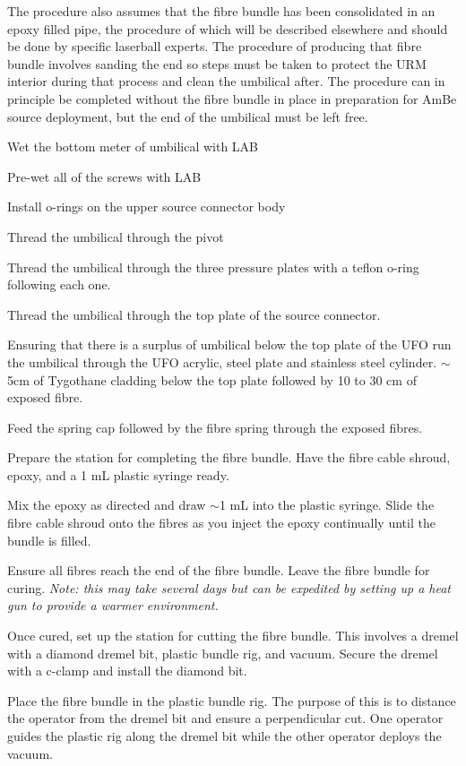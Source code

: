 \documentclass[11pt]{article}
\begin{document}
The procedure also assumes that the fibre bundle has been consolidated
in an epoxy filled pipe, the procedure of which will be described
elsewhere and should be done by specific laserball experts. The
procedure of producing that fibre bundle involves sanding the end so
steps must be taken to protect the URM interior during that process
and clean the umbilical after. The procedure can in principle be
completed without the fibre bundle in place in preparation for AmBe
source deployment, but the end of the umbilical must be left free.

\begin{answerlist}
\item Wet the bottom meter of umbilical with LAB
\item Pre-wet all of the screws with LAB
\item Install o-rings on the upper source connector body 
\item Thread the umbilical through the pivot
\item Thread the umbilical through the three pressure plates with a teflon o-ring following each one.
\item Thread the umbilical through the top plate of the source connector.
\item Ensuring that there is a surplus of umbilical below the top
  plate of the UFO run the umbilical through the UFO acrylic, steel plate and stainless steel cylinder. $\sim$5cm of Tygothane cladding below the top plate followed by 10 to 30 cm of exposed fibre.
\item Feed the spring cap followed by the fibre spring through the exposed fibres.
\item Prepare the station for completing the fibre bundle. Have the fibre cable shroud, epoxy, and a 1 mL plastic syringe ready.
\item Mix the epoxy as directed and draw $\sim$1 mL into the plastic syringe. Slide the fibre cable shroud onto the fibres as you inject the epoxy continually until the bundle is filled.
\item Ensure all fibres reach the end of the fibre bundle. Leave the fibre bundle for curing. \textit{Note: this may take several days but can be expedited by setting up a heat gun to provide a warmer environment.}
\item Once cured, set up the station for cutting the fibre bundle. This involves a dremel with a diamond dremel bit, plastic bundle rig, and vacuum. Secure the dremel with a c-clamp and install the diamond bit.
\item Place the fibre bundle in the plastic bundle rig. The purpose of this is to distance the operator from the dremel bit and ensure a perpendicular cut. One operator guides the plastic rig along the dremel bit while the other operator deploys the vacuum.

\end{answerlist}
\end{document}

